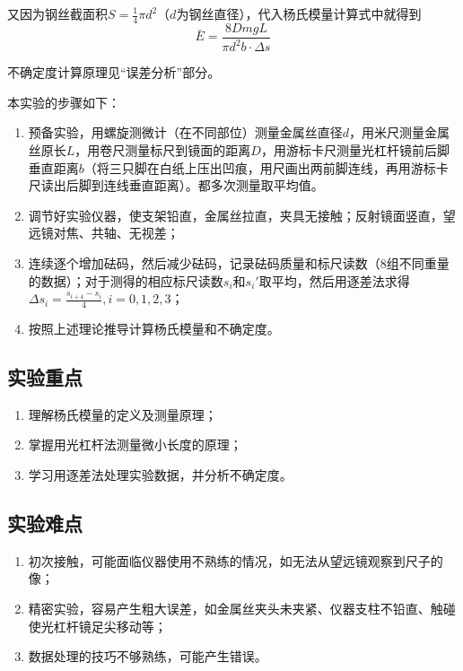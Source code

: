 \documentclass[]{../template/Report}%
\begin{document}
又因为钢丝截面积$S = \frac{1}{4} \pi d^2$（$d$为钢丝直径），代入杨氏模量计算式中就得到
\[\bar{E} = \frac{8DmgL}{\pi d^2 b \cdot \Delta s}\]

不确定度计算原理见“误差分析”部分。


本实验的步骤如下：
\begin{enumerate}
    \item 预备实验，用螺旋测微计（在不同部位）测量金属丝直径$d$，用米尺测量金属丝原长$L$，用卷尺测量标尺到镜面的距离$D$，用游标卡尺测量光杠杆镜前后脚垂直距离$b$（将三只脚在白纸上压出凹痕，用尺画出两前脚连线，再用游标卡尺读出后脚到连线垂直距离）。都多次测量取平均值。
    \item 调节好实验仪器，使支架铅直，金属丝拉直，夹具无接触；反射镜面竖直，望远镜对焦、共轴、无视差；
    \item 连续逐个增加砝码，然后减少砝码，记录砝码质量和标尺读数（8组不同重量的数据）；对于测得的相应标尺读数$s_i$和$s_i'$取平均，然后用逐差法求得$\Delta s_i = \frac{s_{i+4} - s_i}{4} , i=0,1,2,3$；
    \item 按照上述理论推导计算杨氏模量和不确定度。
\end{enumerate}
\subsection{实验重点}

\begin{enumerate}
    \item 理解杨氏模量的定义及测量原理；
    \item 掌握用光杠杆法测量微小长度的原理；
    \item 学习用逐差法处理实验数据，并分析不确定度。
\end{enumerate}

\subsection{实验难点}

\begin{enumerate}
    \item 初次接触，可能面临仪器使用不熟练的情况，如无法从望远镜观察到尺子的像；
    \item 精密实验，容易产生粗大误差，如金属丝夹头未夹紧、仪器支柱不铅直、触碰使光杠杆镜足尖移动等；
    \item 数据处理的技巧不够熟练，可能产生错误。
\end{enumerate}
\end{document}
